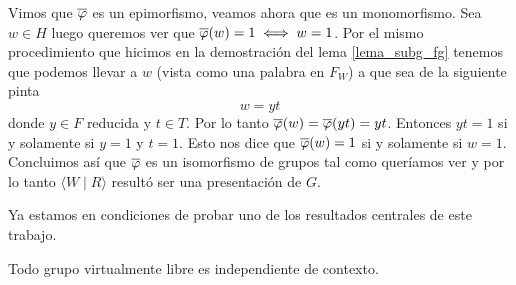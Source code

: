 \documentclass[tesis.tex]{subfiles}
\begin{document}
\begin{obs}
	Vimos que $\overline \varphi$ es un epimorfismo, veamos ahora que es un monomorfismo.
	Sea $w \in H$ luego queremos ver que $\overline \varphi(w) = 1 \iff w = 1$.
	Por el mismo procedimiento que hicimos en la demostración del lema \ref{lema_subg_fg} 
	tenemos que podemos llevar a $w$ (vista como una palabra en $F_{W}$) a que sea de la siguiente pinta
	\[
		w = yt
	\]
	donde $y \in F$ reducida y $t \in T$.
	Por lo tanto $\overline \varphi (w) = \overline \varphi(yt) = yt$.
	Entonces $yt=1$ si y solamente si $y=1$ y $t=1$. 
	Esto nos dice que $\overline \varphi(w) = 1$ si y solamente si $w=1$. 
	Concluimos así que $\overline \varphi$ es un isomorfismo de grupos tal como queríamos ver y por lo tanto  $\langle W \mid R \rangle$ resultó ser una presentación de $G$.
\end{obs}
\medskip

Ya estamos en condiciones de probar uno de los resultados centrales de este trabajo.



\begin{teo}\label{teo_Muller_Schupp}\cite{muller1983groups}
	Todo grupo virtualmente libre es independiente de contexto.
\end{teo}
\end{document}
